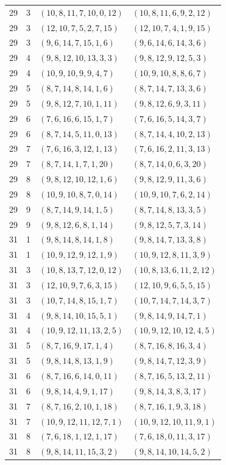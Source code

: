 \begin{longtable}{rrll}
29&3&$(10,8,11,7,10,0,12)$&$(10,8,11,6,9,2,12)$\\
29&3&$(12,10,7,5,2,7,15)$&$(12,10,7,4,1,9,15)$\\
29&3&$(9,6,14,7,15,1,6)$&$(9,6,14,6,14,3,6)$\\
29&4&$(9,8,12,10,13,3,3)$&$(9,8,12,9,12,5,3)$\\
29&4&$(10,9,10,9,9,4,7)$&$(10,9,10,8,8,6,7)$\\
29&5&$(8,7,14,8,14,1,6)$&$(8,7,14,7,13,3,6)$\\
29&5&$(9,8,12,7,10,1,11)$&$(9,8,12,6,9,3,11)$\\
29&6&$(7,6,16,6,15,1,7)$&$(7,6,16,5,14,3,7)$\\
29&6&$(8,7,14,5,11,0,13)$&$(8,7,14,4,10,2,13)$\\
29&7&$(7,6,16,3,12,1,13)$&$(7,6,16,2,11,3,13)$\\
29&7&$(8,7,14,1,7,1,20)$&$(8,7,14,0,6,3,20)$\\
29&8&$(9,8,12,10,12,1,6)$&$(9,8,12,9,11,3,6)$\\
29&8&$(10,9,10,8,7,0,14)$&$(10,9,10,7,6,2,14)$\\
29&9&$(8,7,14,9,14,1,5)$&$(8,7,14,8,13,3,5)$\\
29&9&$(9,8,12,6,8,1,14)$&$(9,8,12,5,7,3,14)$\\
31&1&$(9,8,14,8,14,1,8)$&$(9,8,14,7,13,3,8)$\\
31&1&$(10,9,12,9,12,1,9)$&$(10,9,12,8,11,3,9)$\\
31&3&$(10,8,13,7,12,0,12)$&$(10,8,13,6,11,2,12)$\\
31&3&$(12,10,9,7,6,3,15)$&$(12,10,9,6,5,5,15)$\\
31&3&$(10,7,14,8,15,1,7)$&$(10,7,14,7,14,3,7)$\\
31&4&$(9,8,14,10,15,5,1)$&$(9,8,14,9,14,7,1)$\\
31&4&$(10,9,12,11,13,2,5)$&$(10,9,12,10,12,4,5)$\\
31&5&$(8,7,16,9,17,1,4)$&$(8,7,16,8,16,3,4)$\\
31&5&$(9,8,14,8,13,1,9)$&$(9,8,14,7,12,3,9)$\\
31&6&$(8,7,16,6,14,0,11)$&$(8,7,16,5,13,2,11)$\\
31&6&$(9,8,14,4,9,1,17)$&$(9,8,14,3,8,3,17)$\\
31&7&$(8,7,16,2,10,1,18)$&$(8,7,16,1,9,3,18)$\\
31&7&$(10,9,12,11,12,7,1)$&$(10,9,12,10,11,9,1)$\\
31&8&$(7,6,18,1,12,1,17)$&$(7,6,18,0,11,3,17)$\\
31&8&$(9,8,14,11,15,3,2)$&$(9,8,14,10,14,5,2)$\\

\end{longtable}
